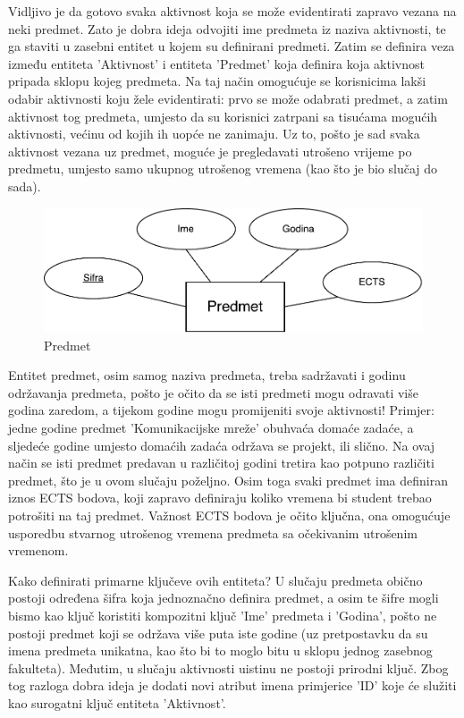 \documentclass[times, utf8, zavrsni]{fer}
\begin{document}
Vidljivo je da gotovo svaka aktivnost koja se može evidentirati zapravo vezana na neki predmet. Zato je dobra ideja odvojiti ime predmeta iz naziva aktivnosti, te ga staviti u zasebni entitet u kojem su definirani predmeti. Zatim se definira veza između entiteta 'Aktivnost' i entiteta 'Predmet' koja definira koja aktivnost pripada sklopu kojeg predmeta. Na taj način omogućuje se korisnicima lakši odabir aktivnosti koju žele evidentirati: prvo se može odabrati predmet, a zatim aktivnost tog predmeta, umjesto da su korisnici zatrpani sa tisućama mogućih aktivnosti, većinu od kojih ih uopće ne zanimaju. Uz to, pošto je sad svaka aktivnost vezana uz predmet, moguće je pregledavati utrošeno vrijeme po predmetu, umjesto samo ukupnog utrošenog vremena (kao što je bio slučaj do sada).

\begin{figure}[H]
\centering
\includegraphics[width=\textwidth,height=\textheight,keepaspectratio]{img/predmet.pdf}
\caption{Predmet}
\label{fig:predmet}
\end{figure}

Entitet predmet, osim samog naziva predmeta, treba sadržavati i godinu održavanja predmeta, pošto je očito da se isti predmeti mogu odravati više godina zaredom, a tijekom godine mogu promijeniti svoje aktivnosti! Primjer: jedne godine predmet 'Komunikacijske mreže' obuhvaća domaće zadaće, a sljedeće godine umjesto domaćih zadaća održava se projekt, ili slično. Na ovaj način se isti predmet predavan u različitoj godini tretira kao potpuno različiti predmet, što je u ovom slučaju poželjno. Osim toga svaki predmet ima definiran iznos ECTS bodova, koji zapravo definiraju koliko vremena bi student trebao potrošiti na taj predmet. Važnost ECTS bodova je očito ključna, ona omogućuje usporedbu stvarnog utrošenog vremena predmeta sa očekivanim utrošenim vremenom.

Kako definirati primarne ključeve ovih entiteta? U slučaju predmeta obično postoji određena šifra koja jednoznačno definira predmet, a osim te šifre mogli bismo kao ključ koristiti kompozitni ključ 'Ime' predmeta i 'Godina', pošto ne postoji predmet koji se održava više puta iste godine (uz pretpostavku da su imena predmeta unikatna, kao što bi to moglo bitu u sklopu jednog zasebnog fakulteta). Međutim, u slučaju aktivnosti uistinu ne postoji prirodni ključ. Zbog tog razloga dobra ideja je dodati novi atribut imena primjerice 'ID' koje će služiti kao surogatni ključ entiteta 'Aktivnost'.
\end{document}
